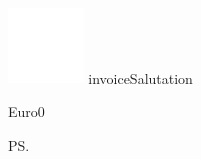 \documentclass[a4paper]{scrlttr2}
\begin{document}
	\begin{letter}{\adressOne \\ 
	\customerStreet \\ \customerZIP \ \customerCity}
	
			\includegraphics[width=0.15\textwidth]{logo.png}	
			\ifcsname invoiceSalutation\endcsname
			\opening{\invoiceSalutation}
			\else
			\opening{ }
			\fi		
			\invoiceText
		    \begin{invoice}{Euro}{0}
			    
		    \end{invoice}
		\ps \invoiceHint
		
		\renewcommand*{\raggedsignature}{\raggedright} 
		\closing{\invoiceClosing}



	\end{letter}
\end{document}
